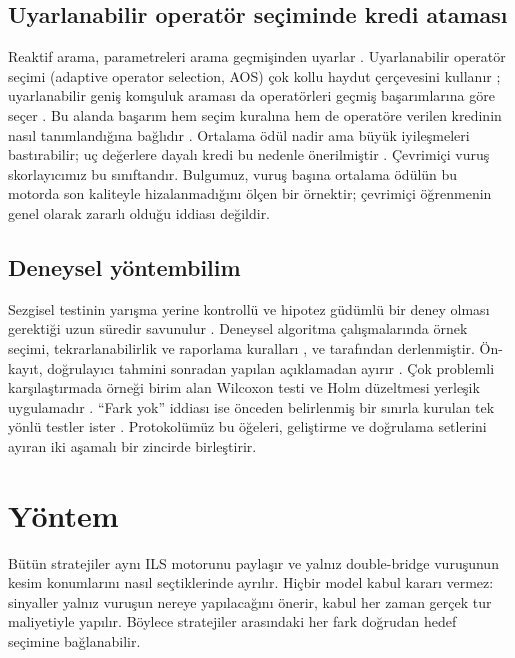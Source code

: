 \documentclass[pdflatex,sn-basic]{sn-jnl}
\begin{document}
\subsection{Uyarlanabilir operatör seçiminde kredi ataması}
Reaktif arama, parametreleri arama geçmişinden uyarlar \citep{battiti_2009_reactive}. Uyarlanabilir
operatör seçimi (adaptive operator selection, AOS) çok kollu haydut çerçevesini kullanır
\citep{auer_2002_ucb, dacosta_2008_aos}; uyarlanabilir geniş komşuluk araması da operatörleri geçmiş
başarımlarına göre seçer \citep{ropke_2006_alns}. Bu alanda başarım hem seçim kuralına \citep{thierens_2005_pursuit} hem de operatöre verilen kredinin nasıl tanımlandığına bağlıdır \citep{fialho_2010_aos}. Ortalama ödül nadir ama büyük
iyileşmeleri bastırabilir; uç değerlere dayalı kredi bu nedenle önerilmiştir \citep{fialho_2008_extreme}.
Çevrimiçi vuruş skorlayıcımız bu sınıftandır. Bulgumuz, vuruş başına ortalama ödülün bu motorda
son kaliteyle hizalanmadığını ölçen bir örnektir; çevrimiçi öğrenmenin genel olarak zararlı olduğu
iddiası değildir.

\subsection{Deneysel yöntembilim}
Sezgisel testinin yarışma yerine kontrollü ve hipotez güdümlü bir deney olması gerektiği uzun
süredir savunulur \citep{hooker_1995_testing}. Deneysel algoritma çalışmalarında örnek seçimi,
tekrarlanabilirlik ve raporlama kuralları \citet{johnson_2002_guide}, \citet{mcgeoch_2012_guide} ve
\citet{bartzbeielstein_2020_benchmarking} tarafından derlenmiştir. Ön-kayıt, doğrulayıcı tahmini
sonradan yapılan açıklamadan ayırır \citep{nosek_2018_prereg}. Çok problemli karşılaştırmada örneği
birim alan Wilcoxon testi ve Holm düzeltmesi yerleşik uygulamadır
\citep{demsar_2006_comparisons, wilcoxon_1945, holm_1979}. ``Fark yok'' iddiası ise önceden belirlenmiş
bir sınırla kurulan tek yönlü testler ister \citep{schuirmann_1987_tost, lakens_2017_equivalence}.
Protokolümüz bu öğeleri, geliştirme ve doğrulama setlerini ayıran iki aşamalı bir zincirde birleştirir.
\section{Yöntem}\label{sec:yontem}

Bütün stratejiler aynı ILS motorunu paylaşır ve yalnız double-bridge vuruşunun kesim konumlarını
nasıl seçtiklerinde ayrılır. Hiçbir model kabul kararı vermez: sinyaller yalnız vuruşun nereye
yapılacağını önerir, kabul her zaman gerçek tur maliyetiyle yapılır. Böylece stratejiler
arasındaki her fark doğrudan hedef seçimine bağlanabilir.
\end{document}
